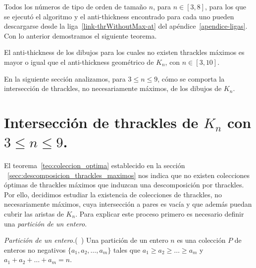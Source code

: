   Todos los números de tipo de orden de tamaño $n$, para $n \in [3,8]$, para los que se ejecutó el
  algoritmo y el anti-thickness encontrado para cada uno pueden descargarse desde la
  liga~\ref{link-thrWithoutMax-at} del apéndice~\ref{apendice-ligas}. Con lo anterior demostramos
  el siguiente teorema.
  \begin{theorem}
    \label{teo:at_sin_thracklesmax}
    El anti-thickness de los dibujos para los cuales no existen thrackles
    máximos es mayor o igual que el anti-thickness geométrico de $K_n$, con $n \in [3,10]$.
  \end{theorem}


  En la siguiente sección analizamos, para $3 \leq n \leq 9$, cómo se comporta la intersección de
  thrackles, no necesariamente máximos, de los dibujos de $K_n$.

\section{Intersección de thrackles de $K_n$ con $3\leq n \leq 9$.}\label{secc:interseccion_thrackles}

    El teorema~\ref{teo:coleccion_optima} establecido en la sección
    ~\ref{secc:descomposicion_thrackles_maximos} nos indica que no existen colecciones óptimas de
    thrackles máximos que induzcan una descomposición por thrackles. Por ello, decidimos estudiar
    la existencia de colecciones de thrackles, no necesariamente máximos,
    cuya intersección a pares es vacía y que además puedan cubrir las aristas
    de $K_n$. Para explicar este proceso primero es necesario definir una
    \emph{partición de un entero}.

    \begin{definition}{\emph{Partición de un entero.}(~\cite{Knuth2011})}
      Una partición de un entero $n$ es una colección $P$ de enteros
      no negativos $\{a_1, a_2, \dots, a_m\}$ tales que
      $a_1 \geq a_2\geq \dots \geq a_m$ y $a_1 + a_2 + \dots + a_m = n$.
    \end{definition}

